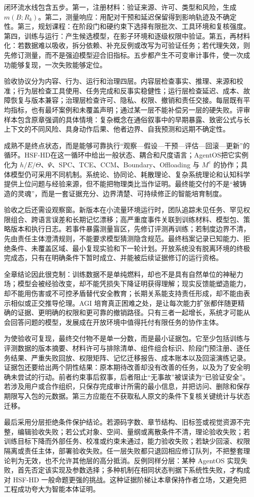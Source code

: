 闭环流水线包含五步。第一，注册材料：验证来源、许可、类型和风险，生成 $m(B;R_k)$。第二，测量响应：用配对干预和延迟保留得到影响轨迹及不确定性。第三，规划课程：在阶段门和硬约束下选择有限批次、工具环境和复核强度。第四，训练与运行：产生候选模型，在影子环境和逐级权限中验证。第五，再材料化：若数据难以吸收，拆分依赖、补充反例或改写为可验证任务；若代理失效，则先修订测量，而不是强迫模型迎合旧指标。五步都产生不可变审计事件，使一次成功能够复现，一次失败能够定位。

验收协议分为内容、行为、运行和治理四层。内容层检查事实、推理、来源和校准；行为层检查工具使用、任务完成和反事实稳健性；运行层检查延迟、成本、故障恢复与版本兼容；治理层检查许可、隐私、权限、撤销和责任交接。每层既有平均指标，也有最坏案例和未覆盖声明；通过某一层不能补偿另一层的硬失败。评审样本包含原章强调的具体情境：复杂概念在通俗叙事中的早期暴露、致密公式与长上下文的不同风险、具身动作后果、他者边界、自我预测和远期不确定性。

成熟不是终点状态，而是能够可靠执行“观察—假设—干预—评估—回滚—更新”的循环。HSF-HD在这一循环中给出一般状态、耦合和尺度语言；AgentOS把它实例化为 $h/E/\Theta$、$\Psi$、SPC、TCE、CCM、Boundary、Offloading 与 $M^e$ 的协作；具体模型仍可采用不同机制。系统论、协同论、耗散理论、复杂系统理论和认知科学提供上位问题与经验来源，但不能把物理类比当作证明。最终能交付的不是“被铸造的灵魂”，而是一套证据充分、边界清楚、可持续修正的智能培育制度。

验收之后还需设观察窗。新版本在小流量环境运行时，团队追踪未见任务、罕见权限组合、跨语言误差和长期记忆漂移；高严重度事件关联到训练材料、模型包、策略版本和执行日志。若事件暴露测量盲区，先修订评测再训练；若制度边界不清，先由责任主体澄清规则，不能要求模型猜测隐含规范。最终档案记录已知能力、拒绝条件、未覆盖区域、最小复现实验和下一轮计划。开放系统没有脱离环境的终极完成态，只有在明确条件下暂时成立、并能被后续证据修订的运行资格。

全章结论因此很克制：训练数据不是单纯燃料，却也不是具有自然单位的神秘力场；模型会被经验改变，却不能凭损失下降证明获得理解；现实反馈能塑造能力，却不能用伤害或不可控矛盾替代安全教育；长期关系能支持责任形成，却不能由表示相似或正交推导伦理。AGI 培育真正困难之处，是让每次能力扩张都伴随更精确的证据、更明确的权限和更可靠的撤销路径。只有三者一起增长，系统才可能从会回答问题的模型，发展成在开放环境中值得托付有限任务的协作主体。

为使验收可复现，最终交付物不是单一分数，而是最小证据包。它至少包括训练与评测数据的版本摘要、材料许可与排除清单、组件组合标识、阶段门预注册、逐任务结果、严重失败回放、权限矩阵、记忆迁移报告、成本账本以及回滚演练记录。证据包还要给出两个阴性结果：原本期待改善却没有改善的任务，以及为了安全明确未尝试的行动。前者约束事后叙事，后者阻止“无事故”被误读为“已验证安全”。若涉及用户或合作组织，只保存完成审计所需的最小信息，并把访问、删除和保存期限写入包的元数据。第三方应能在不获取私人原文的条件下复核关键统计与状态迁移。

最后采用分层拒绝条件保护结论。若源码字数、章节结构、旧标签或视觉资源不完整，编辑验收失败；若公式对象、空间、量纲或离散条件不清，理论验收失败；若训练目标下降而外部任务、校准或约束未通过，能力验收失败；若缺少回滚、权限隔离或责任主体，部署验收失败。任一层失败都只退回相应修订队列，不把整套理论判为无效，也不允许其他层的高分抵消。反例同样分层：某种 AgentOS 实现失败，首先否定该实现及参数选择；多种机制在相同状态判据下系统性失败，才构成对 HSF-HD 一般命题更强的挑战。这种证据阶梯让本章保持作者立场，又避免把工程成功夸大为智能本体证明。

